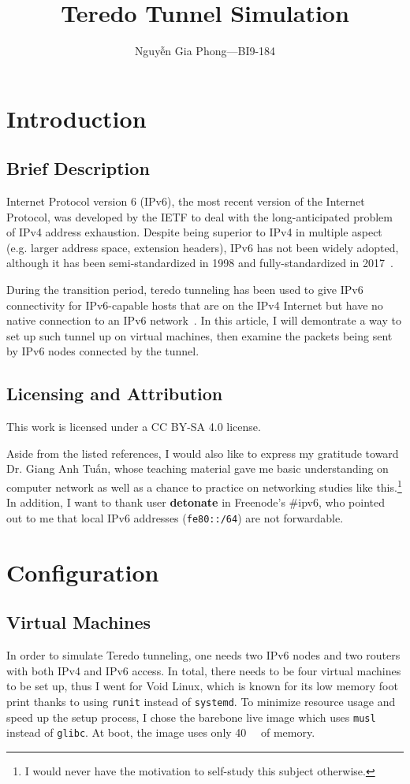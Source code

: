 \documentclass[a4paper,12pt]{article}
\title{Teredo Tunnel Simulation}
\author{\selectlanguage{vietnamese}Nguyễn Gia Phong---BI9-184}
\newcommand{\byte}{\mathrm{B}}
\begin{document}
\maketitle
\tableofcontents

\newpage
\section{Introduction}
\subsection{Brief Description}
Internet Protocol version 6 (IPv6), the most recent version of
the Internet Protocol, was developed by the IETF to deal with
the long-anticipated problem of IPv4 address exhaustion.  Despite being
superior to IPv4 in multiple aspect (e.g. larger address space,
extension headers), IPv6 has not been widely adopted, although it has been
semi-standardized in 1998 and fully-standardized in 2017~\cite{rfc8200}.

During the transition period, teredo tunneling has been used to give
IPv6 connectivity for IPv6-capable hosts that are on the IPv4 Internet
but have no native connection to an IPv6 network~\cite{rfc4380}.
In this article, I will demontrate a way to set up such tunnel up
on virtual machines, then examine the packets being sent by IPv6 nodes
connected by the tunnel.

\subsection{Licensing and Attribution}
This work is licensed under a CC BY-SA 4.0 license.

Aside from the listed references, I would also like to express my gratitude
toward Dr. {Giang Anh Tuấn}, whose teaching material
gave me basic understanding on computer network as well as a chance to practice
on networking studies like this.\footnote{I would never have the motivation to
self-study this subject otherwise.}  In addition, I want to thank user
\textbf{detonate} in Freenode's \#ipv6, who pointed out to me that local
IPv6 addresses (\verb|fe80::/64|) are not forwardable.

\section{Configuration}
\subsection{Virtual Machines}
In order to simulate Teredo tunneling, one needs two IPv6 nodes and two routers
with both IPv4 and IPv6 access.  In total, there needs to be four
virtual machines to be set up, thus I went for Void Linux, which is known
for its low memory foot print thanks to using \verb|runit| instead
of \verb|systemd|.  To minimize resource usage and speed up the setup process,
I chose the barebone live image which uses \verb|musl| instead of \verb|glibc|.
At boot, the image uses only \SI{40}{\mega\byte} of memory.
\end{document}
